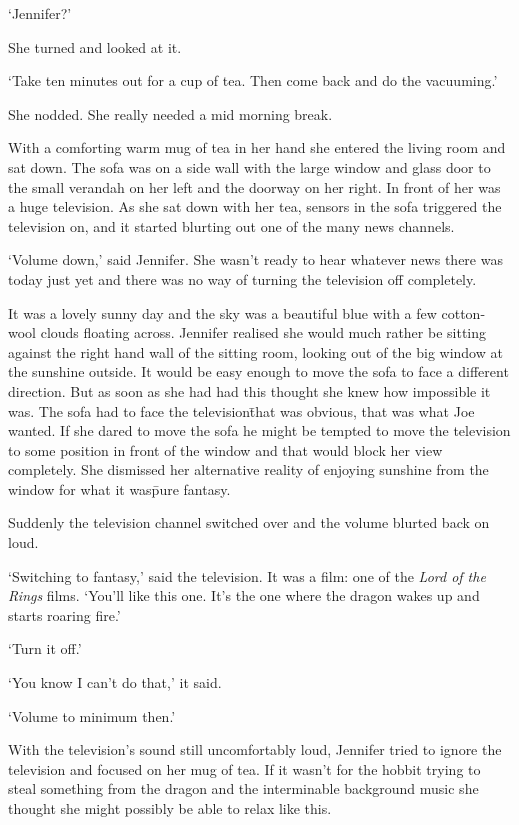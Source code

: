 `Jennifer?'

She turned and looked at it.

`Take ten minutes out for a cup of tea. Then come back and do the 
vacuuming.'

She nodded. She really needed a mid morning break.

With a comforting warm mug of tea in her hand she entered the living room 
and sat down. The sofa was on a side wall with the large window 
and glass door to the small verandah on her left and the doorway on 
her right. In front of her was a huge television. As she sat down 
with her tea, sensors in the sofa triggered the television on, and 
it started blurting out one of the many news channels.

`Volume down,' said Jennifer. She wasn't ready to hear whatever 
news there was today just yet and there was no way of turning the 
television off completely.

It was a lovely sunny day and the sky was a beautiful blue with a few 
cotton-wool clouds floating across. Jennifer realised she would 
much rather be sitting against the right hand wall of the sitting 
room, looking out of the big window at the sunshine outside. It 
would be easy enough to move the sofa to face a different 
direction. But as soon as she had had this thought she knew how 
impossible it was. The sofa had to face the television\=that was 
obvious, that was what Joe wanted. If she dared to move the sofa he 
might be tempted to move the television to some position in front 
of the window and that would block her view completely. She 
dismissed her alternative reality of enjoying sunshine from the 
window for what it was\=pure fantasy.

Suddenly the television channel switched over and the volume 
blurted back on loud.

`Switching to fantasy,' said the television. It was a film: one of 
the \textit{Lord of the Rings} films. `You'll like this one. It's 
the one where the dragon wakes up and starts roaring fire.'

`Turn it off.'

`You know I can't do that,' it said. 

`Volume to minimum then.'

With the television's sound still uncomfortably loud, Jennifer 
tried to ignore the television and focused on her mug of tea. If it 
wasn't for the hobbit trying to steal something from the dragon and 
the interminable background music she thought she might 
possibly be able to relax like this.

